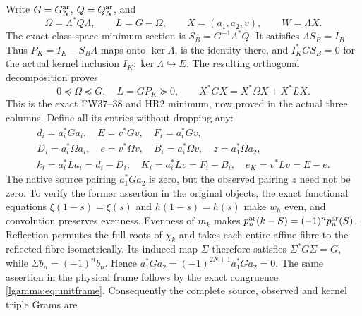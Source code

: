 \documentclass[11pt]{article}
\begin{document}
Write $G=G_N^{\rm ar}$, $Q=Q_N^{\rm ar}$, and
\begin{equation}\label{lgamma:eq:omegal}
 \Omega=\Lambda^*Q\Lambda,\qquad L=G-\Omega,\qquad
 X=(a_1,a_2,v),\qquad W=\Lambda X.
\end{equation}
The exact class-space minimum section is
$S_B=G^{-1}\Lambda^*Q$.  It satisfies $\Lambda S_B=I_B$.
Thus $P_K=I_E-S_B\Lambda$ maps onto $\ker\Lambda$, is the identity
there, and $I_K^*GS_B=0$ for the actual kernel inclusion
$I_K:\ker\Lambda\hookrightarrow E$.
The resulting orthogonal decomposition proves
\begin{equation}\label{lgamma:eq:split}
 0\preceq\Omega\preceq G,\quad L=GP_K\succeq0,
 \qquad X^*GX=X^*\Omega X+X^*LX.
\end{equation}
This is the exact FW37--38 and HR2 minimum, now proved in the actual
three columns.  Define all its entries without dropping any:
\begin{equation}\label{lgamma:eq:entries}
 \begin{gathered}
 d_i=a_i^*Ga_i,\quad E=v^*Gv,\quad F_i=a_i^*Gv,\\
 D_i=a_i^*\Omega a_i,\quad e=v^*\Omega v,\quad
 B_i=a_i^*\Omega v,\quad z=a_1^*\Omega a_2,\\
 k_i=a_i^*La_i=d_i-D_i,\quad
 K_i=a_i^*Lv=F_i-B_i,\quad e_K=v^*Lv=E-e.
 \end{gathered}
\end{equation}
The native source pairing $a_1^*Ga_2$ is zero, but the observed pairing
$z$ need not be zero.  To verify the former assertion in the original
objects, the exact functional equations $\xi(1-s)=\xi(s)$ and
$h(1-s)=h(s)$ make $w_h$ even, and convolution preserves evenness.
Evenness of $m_k$ makes $p_n^{\rm ar}(k-S)=(-1)^np_n^{\rm ar}(S)$.
Reflection permutes the full roots of $\chi_k$ and takes each entire
affine fibre to the reflected fibre isometrically.  Its induced map
$\Sigma$ therefore satisfies $\Sigma^*G\Sigma=G$, while
$\Sigma b_n=(-1)^nb_n$.  Hence
$a_1^*Ga_2=(-1)^{2N+1}a_1^*Ga_2=0$.  The same assertion in the
physical frame follows by the exact congruence \eqref{lgamma:eq:unitframe}.
Consequently the complete source, observed and kernel triple Grams are
\end{document}
